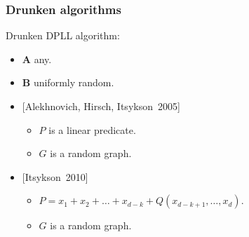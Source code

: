 \begin{frame}
	\frametitle{Drunken algorithms}

    \begin{definition}
        Drunken DPLL algorithm:
        \begin{itemize}
	        \item $\mathbf{A}$ any.
        	\item $\mathbf{B}$ uniformly random.
        \end{itemize}
    \end{definition}

    \pause
    \begin{itemize}
    	\item{} [Alekhnovich, Hirsch, Itsykson~2005]
            \begin{itemize}
	            \item $P$ is a linear predicate.
            	\item $G$ is a random graph.
            \end{itemize}
        \pause
        \item{} [Itsykson~2010]
            \begin{itemize}
	            \item $P = x_1 + x_2 + \dots + x_{d - k} +
            		Q(x_{d - k + 1}, \dots, x_d)$.
            	\item $G$ is a random graph.
            \end{itemize}
    \end{itemize}
\end{frame}

